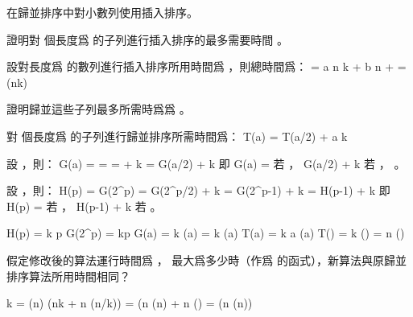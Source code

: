 \startsubject[
  title={Problems},
]
\startPROBLEM
在歸並排序中對小數列使用插入排序。
\startigBase[a]

\item 證明對  個長度爲  的子列進行插入排序的最多需要時間 。

\startANSWER
設對長度爲  的數列進行插入排序所用時間爲 ，則總時間爲：
\startformula
{} = a n k + b n +  = \Theta(nk)
\stopformula
\stopANSWER

\item 證明歸並這些子列最多所需時爲爲 。

\startANSWER
對  個長度爲  的子列進行歸並排序所需時間爲：
\startformula
T(a) = \startcases
{}	\NC {} \NR
{} T(a/2) + a k \NC {} \NR
\stopcases
\stopformula

設 ，則：
\startformula\startalign
\NC G(a)	\NC =  \NR
\NC 		\NC =  \NR
\NC		\NC =  + k \NR
\NC		\NC = G(a/2) + k \NR
\stopalign\stopformula
即
\startformula
G(a) = \startcases
{}	\NC 若 ，\NR
\NC G(a/2) + k \NC 若 ， 。\NR
\stopcases
\stopformula

設 ，則：
\startformula\startalign
\NC H(p)	\NC = G(2^p) \NR
\NC		\NC = G(2^p/2) + k \NR
\NC		\NC = G(2^{p-1}) + k \NR
\NC		\NC = H(p-1) + k \NR
\stopalign\stopformula
即
\startformula
H(p) = \startcases
{}	\NC 若 ， \NR
\NC H(p-1) + k \NC 若 。 \NR
\stopcases
\stopformula

\startformula\startalign
\NC H(p) \NC = k p \NR
\NC G(2^p) \NC = kp \NR
\NC G(a) \NC = k \lg(a) \NR
\NC {} \NC = k \lg(a) \NR
\NC T(a) \NC = k a \lg(a) \NR
\NC T() \NC = k  \lg() \NR
\NC		\NC = n \lg() \NR
\stopalign\stopformula
\stopANSWER

\item 假定修改後的算法運行時間爲 ，
 最大爲多少時（作爲  的函式），新算法與原歸並排序算法所用時間相同？

\startANSWER
\startformula\startalign
\NC k \NC = \lg(n) \NR
\NC \Theta(nk + n \lg(n/k)) \NC = \Theta(n \lg(n) + n \lg() \NR
\NC			\NC = \Theta(n \lg(n)) \NR
\stopalign\stopformula
\stopANSWER

\stopigBase
\stopPROBLEM

